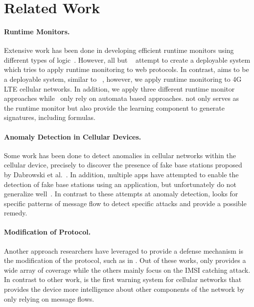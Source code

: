 \section{Related Work}

\paragraph{Runtime Monitors.} Extensive work has been done in
developing efficient runtime monitors using different types of
logic~\cite{basin2010monitoring, basin2010policy, basin2008runtime,
basin2015monitoring, monpoly, bauer2011runtime, du2015trace,
rosu2001synthesizing,soewito2009self, wpse}. However, all but
~\cite{soewito2009self, wpse} attempt to create a deployable
system which tries to apply runtime monitoring to web protocols.
In contrast, \system aims to be a deployable system, similar
to ~\cite{soewito2009self, wpse}, however, we apply runtime
monitoring to 4G LTE cellular networks. In addition, we apply three different
runtime monitor approaches while~\cite{soewito2009self, wpse}
only rely on automata based approaches. \system not only serves
as the runtime monitor but also provide the learning component
to generate signatures, including \pltl formulas.

\paragraph{Anomaly Detection in Cellular Devices.} Some work has been done to detect anomalies in cellular networks within the cellular device, precisely to discover the presence of fake base stations proposed by Dabrowski et al.~\cite{imsi_catcher_catchers}. In addition,  multiple apps have attempted to enable the detection of fake base stations using an application, but unfortunately do not generalize well~\cite{white_stingray}. In contrast to these attempts at anomaly detection, \system looks for specific patterns of message flow to detect specific attacks and provide a possible remedy.


\paragraph{Modification of Protocol.} Another approach researchers have leveraged to provide a defense mechanism is the modification of the protocol, such as in \cite{concealing_imsi_in_5g, privacy_5g, PMSI_desynchronization, imsicatcher_ccs15, wisec_root}. Out of these works, only \cite{wisec_root} provides a wide array of coverage while the others mainly focus on the IMSI catching attack. In contrast to other work, \system is the first warning system for cellular networks that provides the device more intelligence about other components of the network by only relying on message flows.
